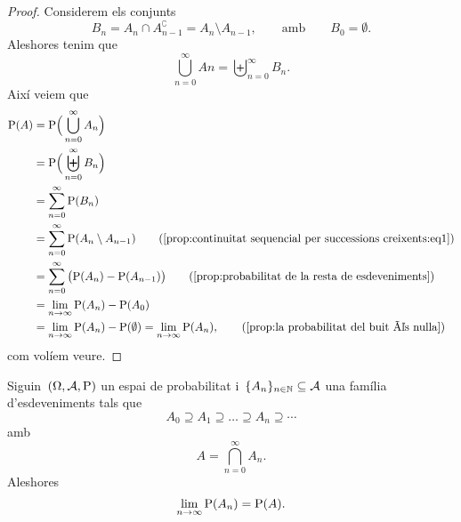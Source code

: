 \documentclass[../../main.tex]{subfiles}
\begin{document}
    \begin{proof}
        Considerem els conjunts
        \begin{equation}
            \label{prop:continuitat sequencial per successions creixents:eq1}
            B_{n}=A_{n}\cap A_{n-1}^{\complement}=A_{n}\setminus A_{n-1},\qquad\text{amb}\qquad B_{0}=\emptyset.
        \end{equation}
        Aleshores tenim que %
        \[
            \bigcup_{n=0}^{\infty}A{n}=\biguplus_{n=0}^{\infty}B_{n}.
        \]
        Així veiem que
        \begin{align*}
            \Probabilitat(A)&=\Probabilitat\Big(\bigcup_{n=0}^{\infty}A_{n}\Big) \\
            &=\Probabilitat\Big(\biguplus_{n=0}^{\infty}B_{n}\Big) \\
            &=\sum_{n=0}^{\infty}\Probabilitat(B_{n}) \\
            &=\sum_{n=0}^{\infty}\Probabilitat(A_{n}\setminus A_{n-1}) \tag{\ref{prop:continuitat sequencial per successions creixents:eq1}}\\
            &=\sum_{n=0}^{\infty}\big(\Probabilitat(A_{n})-\Probabilitat(A_{n-1})\big)\tag{\ref{prop:probabilitat de la resta de esdeveniments}} \\
            &=\lim_{n\to\infty}\Probabilitat(A_{n})-\Probabilitat(A_{0}) \\
            &=\lim_{n\to\infty}\Probabilitat(A_{n})-\Probabilitat(\emptyset)=\lim_{n\to\infty}\Probabilitat(A_{n}), \tag{\ref{prop:la probabilitat del buit és nulla}}
        \end{align*}
        com volíem veure.
    \end{proof}
    \begin{proposition}
        \label{prop:continuitat sequencial per successions decreixents}
        Siguin~\((\Omega,\mathcal{A},\mathrm{P})\) un espai de probabilitat i~\(\{A_{n}\}_{n\in\mathbb{N}}\subseteq\mathcal{A}\) una família d'esdeveniments tals que
        \[
            A_{0}\supseteq A_{1}\supseteq\dots\supseteq A_{n}\supseteq\cdots
        \]
        amb
        \[
            A=\bigcap_{n=0}^{\infty}A_{n}.
        \]
        Aleshores
        \[
            \lim_{n\to\infty}\mathrm{P}(A_{n})=\mathrm{P}(A).
        \]
    \end{proposition}
\end{document}
